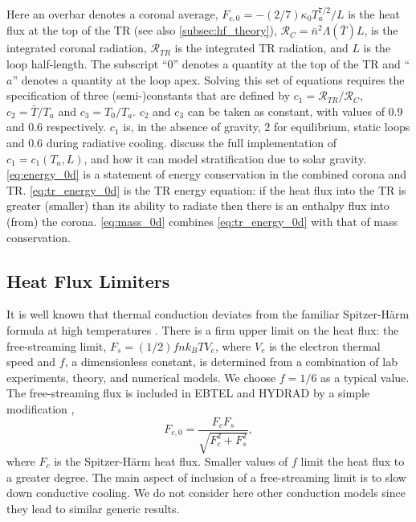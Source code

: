 \documentclass[apj]{emulateapj}
\begin{document}
Here an overbar denotes a coronal average, $F_{c,0} = -(2/7)\kappa_0 T_a^{7/2}/L$ is the heat flux at the top of the TR (see also \autoref{subsec:hf_theory}), $\mathcal{R}_C=\bar{n}^2\Lambda(\bar{T})L$, is the integrated coronal radiation, $\mathcal{R}_{TR}$ is the integrated TR radiation, and $L$ is the loop half-length. The subscript ``0'' denotes a quantity at the top of the TR and ``$a$'' denotes a quantity at the loop apex. Solving this set of equations requires the specification of three (semi-)constants that are defined by  $c_1=\mathcal{R}_{TR}/\mathcal{R}_C$, $c_2=\bar{T}/T_a$ and $c_3=T_0/T_a$. $c_2$ and $c_3$ can be taken as constant, with values of 0.9 and 0.6 respectively. $c_1$ is, in the absence of gravity, 2 for equilibrium, static loops and 0.6 during radiative cooling. \citet{cargill_enthalpy-based_2012} discuss the full implementation of $c_1 = c_1(T_a,L)$, and how it can model stratification due to solar gravity. \autoref{eq:energy_0d} is a statement of energy conservation in the combined corona and TR. \autoref{eq:tr_energy_0d} is the TR energy equation: if the heat flux into the TR is greater (smaller) than its ability to radiate then there is an enthalpy flux into (from) the corona. \autoref{eq:mass_0d} combines \autoref{eq:tr_energy_0d} with that of mass conservation.
	
	\subsection{Heat Flux Limiters}
	\label{subsec:hf_theory}
	\par It is well known that thermal conduction deviates from the familiar Spitzer-H{\"a}rm formula \citep{spitzer_transport_1953} at high temperatures \citep[e.g.][]{ljepojevic_heat_1989}. There is a firm upper limit on the heat flux: the free-streaming limit, $F_s=(1/2)fnk_BTV_e$, where $V_e$ is the electron thermal speed and $f$, a dimensionless constant, is determined from a combination of lab experiments, theory, and numerical models. We choose $f = 1/6$ as a typical value. The free-streaming flux is included in EBTEL and HYDRAD by a simple modification \citep{klimchuk_highly_2008},
	\begin{equation}
		F_{c,0} = \frac{F_cF_s}{\sqrt{F_c^2 + F_s^2}},
	\end{equation}
where $F_c$ is the Spitzer-H{\"a}rm heat flux. Smaller values of $f$ limit the heat flux to a greater degree. The main aspect of inclusion of a free-streaming limit is to slow down conductive cooling. We do not consider here other conduction models \citep[e.g. the non-local model discussed in the coronal context by][]{karpen_nonlocal_1987,ciaravella_non-local_1991,west_lifetime_2008} since they lead to similar generic results. 
\end{document}

